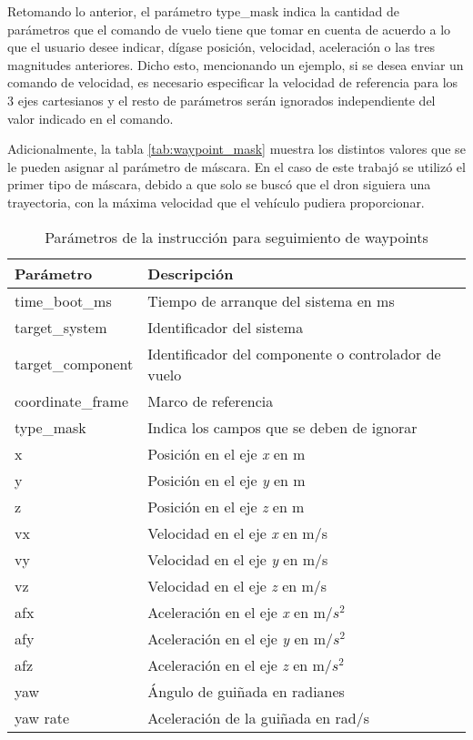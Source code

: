 Retomando lo anterior, el parámetro type\_mask indica la cantidad de parámetros que el comando de vuelo tiene que tomar en cuenta de acuerdo a lo que el usuario desee indicar, dígase posición, velocidad, aceleración o las tres magnitudes anteriores. Dicho esto, mencionando un ejemplo, si se desea enviar un comando de velocidad, es necesario especificar la velocidad de referencia para los 3 ejes cartesianos y el resto de parámetros serán ignorados independiente del valor indicado en el comando.

Adicionalmente, la tabla \ref{tab:waypoint_mask} muestra los distintos valores que se le pueden asignar al parámetro de máscara. En el caso de este trabajó se utilizó el primer tipo de máscara, debido a que solo se buscó que el dron siguiera una trayectoria, con la máxima velocidad que el vehículo pudiera proporcionar.

\begin{table}[ht]
    \centering
    \begin{tabular}{||l|l||}
        \hline
        Parámetro & Descripción\\
        \hline
        time\_boot\_ms & Tiempo de arranque del sistema en ms\\
        target\_system & Identificador del sistema\\
        target\_component & Identificador del componente o controlador de vuelo\\
        coordinate\_frame & Marco de referencia\\
        type\_mask & Indica los campos que se deben de ignorar\\
        x & Posición en el eje \textit{x} en m\\
        y & Posición en el eje \textit{y} en m\\
        z & Posición en el eje \textit{z} en m\\
        vx & Velocidad en el eje \textit{x} en m/s\\
        vy & Velocidad en el eje \textit{y} en m/s\\
        vz & Velocidad en el eje \textit{z} en m/s\\
        afx & Aceleración en el eje \textit{x} en m/$s^2$\\
        afy & Aceleración en el eje \textit{y} en m/$s^2$\\
        afz & Aceleración en el eje \textit{z} en m/$s^2$\\
        yaw & Ángulo de guiñada en radianes\\
        yaw rate & Aceleración de la guiñada en rad/s\\
        \hline
    \end{tabular}
    \caption{Parámetros de la instrucción para seguimiento de waypoints}
    \label{tab:waypoint}
\end{table}

